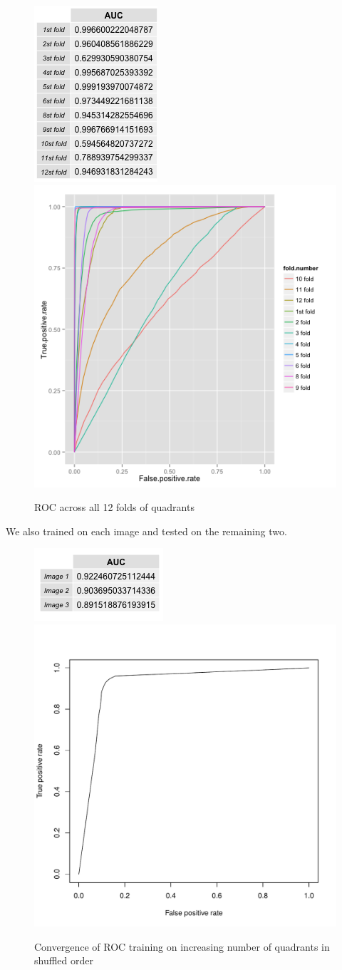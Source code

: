\documentclass{article}\usepackage[]{graphicx}\usepackage[]{color}
\begin{document}
\begin{figure}[H]
  \includegraphics[width=\linewidth, height = 150pts]{AUC_12_folds.png}
\endminipage\hfill
{}%
  \includegraphics[width=\linewidth, height = 150pts]{ROC_fold_comparison.png}
\endminipage
  \caption{ROC across all 12 folds of quadrants}\label{}
\end{figure}

We also trained on each image and tested on the remaining two. \\


  \begin{figure}[H]
\centering
  \includegraphics[width=150pts, height = 80pts ]{AUC_images.png}
\endminipage\hfill
{}
  \includegraphics[width=\linewidth, height = 150pts]{ROC_image1.pdf}
\endminipage\hfill
  \caption{Convergence of ROC training on increasing number of quadrants in shuffled order}\label{}
\end{figure}
\end{document}
